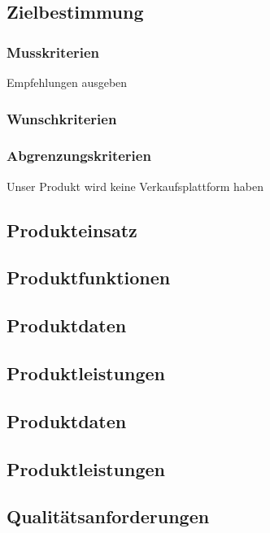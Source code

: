 \subsection{Zielbestimmung}

\subsubsection{Musskriterien}
Empfehlungen ausgeben

\subsubsection{Wunschkriterien}

\subsubsection{Abgrenzungskriterien}
Unser Produkt wird keine Verkaufsplattform haben 

\subsection{Produkteinsatz}

\subsection{Produktfunktionen}

\subsection{Produktdaten}

\subsection{Produktleistungen}

\subsection{Produktdaten}

\subsection{Produktleistungen}

\subsection{Qualitätsanforderungen}

